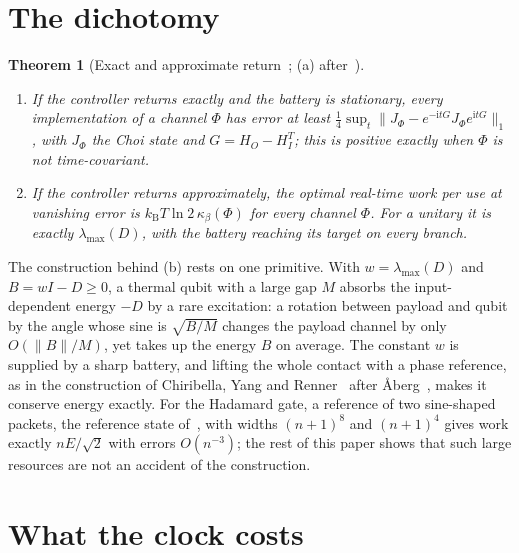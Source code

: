 \documentclass[11pt]{article}
\newtheorem{theorem}{Theorem}
\theoremstyle{definition}
\theoremstyle{remark}
\newcommand{\kB}{k_{\mathrm B}}
\newcommand{\Trt}{\kappa_\beta}
\begin{document}
\FloatBarrier
\section{The dichotomy}\label{sec:dichotomy}

\begin{theorem}[Exact and approximate return~\cite{SaveWork}; (a) after~\cite{MarvianSpekkens19,LostaglioMuller19}]\label{thm:dichotomy}
\begin{enumerate}[label=(\alph*)]
\item If the controller returns exactly and the battery is stationary, every implementation of a channel $\Phi$ has error at least $\frac14\sup_t\|J_\Phi-e^{-\mathrm itG}J_\Phi e^{\mathrm itG}\|_1$, with $J_\Phi$ the Choi state and $G=H_O-H_I^T$; this is positive exactly when $\Phi$ is not time-covariant.
\item If the controller returns approximately, the optimal real-time work per use at vanishing error is $\kB T\ln2\,\Trt(\Phi)$ for every channel $\Phi$. For a unitary it is exactly $\lambda_{\max}(D)$, with the battery reaching its target on every branch.
\end{enumerate}
\end{theorem}

The construction behind (b) rests on one primitive. With $w=\lambda_{\max}(D)$ and $B=wI-D\ge0$, a thermal qubit with a large gap $M$ absorbs the input-dependent energy $-D$ by a rare excitation: a rotation between payload and qubit by the angle whose sine is $\sqrt{B/M}$ changes the payload channel by only $O(\|B\|/M)$, yet takes up the energy $B$ on average. The constant $w$ is supplied by a sharp battery, and lifting the whole contact with a phase reference, as in the construction of Chiribella, Yang and Renner~\cite{ChiribellaYangRenner21} after {\AA}berg~\cite{Aberg14}, makes it conserve energy exactly. For the Hadamard gate, a reference of two sine-shaped packets, the reference state of~\cite{ChiribellaYangRenner21}, with widths $(n+1)^8$ and $(n+1)^4$ gives work exactly $nE/\sqrt2$ with errors $O(n^{-3})$; the rest of this paper shows that such large resources are not an accident of the construction.

\section{What the clock costs}\label{sec:costs}
\end{document}
